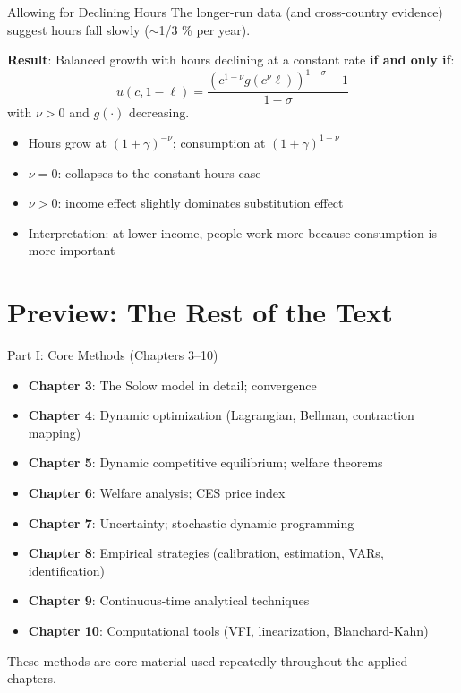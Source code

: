 \documentclass[blue]{beamer}
\begin{document}
\begin{frame}{Allowing for Declining Hours}
	The longer-run data (and cross-country evidence) suggest hours fall slowly ($\sim$1/3 \% per year).
	
	\bigskip
	\textbf{Result}: Balanced growth with hours declining at a constant rate \textbf{if and only if}:
	\[
	u(c, 1-\ell) = \frac{(c^{1-\nu} g(c^\nu \ell))^{1-\sigma} - 1}{1-\sigma}
	\]
	with $\nu > 0$ and $g(\cdot)$ decreasing.
	
	\bigskip
	\begin{itemize}
		\item Hours grow at $(1+\gamma)^{-\nu}$; consumption at $(1+\gamma)^{1-\nu}$
		\item $\nu = 0$: collapses to the constant-hours case
		\item $\nu > 0$: income effect slightly dominates substitution effect
		\item Interpretation: at lower income, people work more because consumption is more important
	\end{itemize}
\end{frame}


\section{Preview: The Rest of the Text}

\begin{frame}{Part I: Core Methods (Chapters 3--10)}
	\begin{itemize}
		\item \textbf{Chapter 3}: The Solow model in detail; convergence
		\item \textbf{Chapter 4}: Dynamic optimization (Lagrangian, Bellman, contraction mapping)
		\item \textbf{Chapter 5}: Dynamic competitive equilibrium; welfare theorems
		\item \textbf{Chapter 6}: Welfare analysis; CES price index
		\item \textbf{Chapter 7}: Uncertainty; stochastic dynamic programming
		\item \textbf{Chapter 8}: Empirical strategies (calibration, estimation, VARs, identification)
		\item \textbf{Chapter 9}: Continuous-time analytical techniques
		\item \textbf{Chapter 10}: Computational tools (VFI, linearization, Blanchard-Kahn)
	\end{itemize}
	These methods are core material used repeatedly throughout the applied chapters.
\end{frame}
\end{document}
